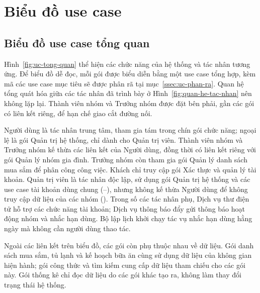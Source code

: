 \section{Biểu đồ use case}\label{sec:bieu-do-uc}

\subsection{Biểu đồ use case tổng quan}\label{ssec:uc-tong-quan}

Hình~\ref{fig:uc-tong-quan} thể hiện các chức năng của hệ thống và tác nhân tương ứng. Để biểu đồ dễ đọc, mỗi gói được biểu diễn bằng một use case tổng hợp, kèm mã các use case mục tiêu sẽ được phân rã tại mục~\ref{ssec:uc-phan-ra}. Quan hệ tổng quát hóa giữa các tác nhân đã trình bày ở Hình~\ref{fig:quan-he-tac-nhan} nên không lặp lại. Thành viên nhóm và Trưởng nhóm được đặt bên phải, gần các gói có liên kết riêng, để hạn chế giao cắt đường nối.


Người dùng là tác nhân trung tâm, tham gia tám trong chín gói chức năng; ngoại lệ là gói Quản trị hệ thống, chỉ dành cho Quản trị viên. Thành viên nhóm và Trưởng nhóm kế thừa các liên kết của Người dùng, đồng thời có liên kết riêng với gói Quản lý nhóm gia đình. Trưởng nhóm còn tham gia gói Quản lý danh sách mua sắm để phân công công việc. Khách chỉ truy cập gói Xác thực và quản lý tài khoản. Quản trị viên là tác nhân độc lập, sử dụng gói Quản trị hệ thống và các use case tài khoản dùng chung (--), nhưng không kế thừa Người dùng để không truy cập dữ liệu của các nhóm (). Trong số các tác nhân phụ, Dịch vụ thư điện tử hỗ trợ các chức năng tài khoản; Dịch vụ thông báo đẩy gửi thông báo hoạt động nhóm và nhắc hạn dùng. Bộ lập lịch khởi chạy tác vụ nhắc hạn dùng hằng ngày mà không cần người dùng thao tác.

Ngoài các liên kết trên biểu đồ, các gói còn phụ thuộc nhau về dữ liệu. Gói danh sách mua sắm, tủ lạnh và kế hoạch bữa ăn cùng sử dụng dữ liệu của không gian hiện hành; gói công thức và tìm kiếm cung cấp dữ liệu tham chiếu cho các gói này. Gói thống kê chỉ đọc dữ liệu do các gói khác tạo ra, không làm thay đổi trạng thái hệ thống.

